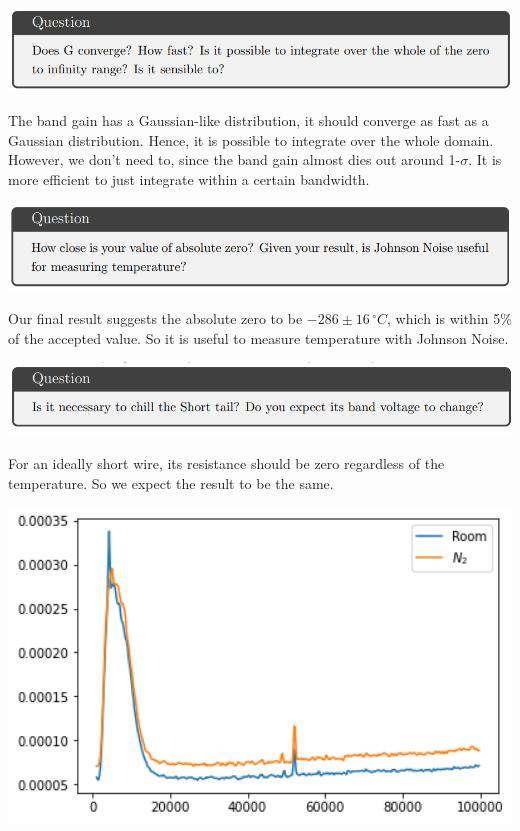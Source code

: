 \documentclass[a4paper]{tufte-handout}
\begin{document}

\hrulefill

\includegraphics[width = 1\textwidth]{figures/q4.png}

The band gain has a Gaussian-like distribution, it should converge as fast as a Gaussian distribution. Hence, it is possible to integrate over the whole domain. However, we don't need to, since the band gain almost dies out around 1-$\sigma$. It is more efficient to just integrate within a certain bandwidth.

\hrulefill

\includegraphics[width = 1\textwidth]{figures/q5.png}

Our final result suggests the absolute zero to be $-286\pm 16\,\si{^\circ C}$, which is within 5\% of the accepted value. So it is useful to measure temperature with Johnson Noise.

\hrulefill

\includegraphics[width = 1\textwidth]{figures/q6.png}

For an ideally short wire, its resistance should be zero regardless of the temperature. So we expect the result to be the same.

\includegraphics[width = 1\textwidth]{figures/q6a.png}
\end{document}
